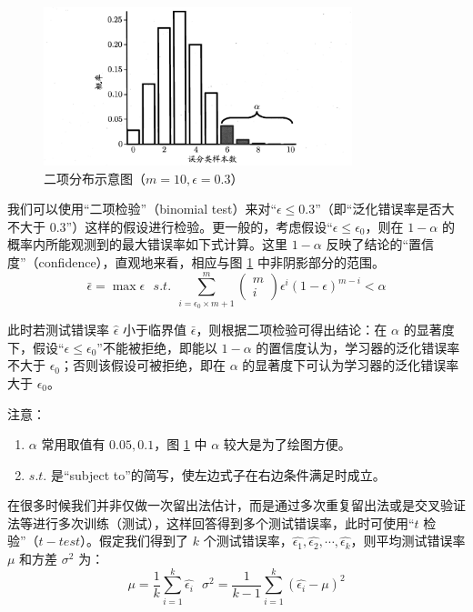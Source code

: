 \documentclass[12pt, a4paper]{article} %
\begin{document}
\begin{figure}[H]
    \centering
    \includegraphics[width=0.8\textwidth]{../img/2-7-二项分布示意图.png}
    \caption{二项分布示意图（$m = 10, \epsilon = 0.3$）}
    \label{fig:二项分布示意图}
\end{figure}

我们可以使用“二项检验”（binomial test）来对“$\epsilon \le 0.3$”（即“泛化错误率是否大不大于 $0.3$”）这样的假设进行检验。更一般的，考虑假设“$\epsilon \le \epsilon_0$，则在 $1 - \alpha$ 的概率内所能观测到的最大错误率如下式计算。这里 $1 - \alpha$ 反映了结论的“置信度”（confidence），直观地来看，相应与图 \ref{fig:二项分布示意图} 中非阴影部分的范围。
\begin{equation*}
    \bar{\epsilon} = \max \epsilon \ \ \ s.t. \ \ \sum_{i = \epsilon_0 \times m + 1}^{m} \left( {\begin{array}{*{20}{c}}
        m\\
        i
        \end{array}} \right) \epsilon^i (1 - \epsilon)^{m - i} < \alpha
\end{equation*}

此时若测试错误率 $\hat{\epsilon}$ 小于临界值 $\bar{\epsilon}$，则根据二项检验可得出结论：在 $\alpha$ 的显著度下，假设“$\epsilon \le \epsilon_0$”不能被拒绝，即能以 $1 - \alpha$ 的置信度认为，学习器的泛化错误率不大于 $\epsilon_0$；否则该假设可被拒绝，即在 $\alpha$ 的显著度下可认为学习器的泛化错误率大于 $\epsilon_0$。

注意：
\begin{enumerate}[\hspace*{2em} i.]
    \item $\alpha$ 常用取值有 $0.05, 0.1$，图 \ref{fig:二项分布示意图} 中 $\alpha$ 较大是为了绘图方便。
    \item $s.t.$ 是“subject to”的简写，使左边式子在右边条件满足时成立。
\end{enumerate}

在很多时候我们并非仅做一次留出法估计，而是通过多次重复留出法或是交叉验证法等进行多次训练（测试），这样回答得到多个测试错误率，此时可使用“$t$ 检验”（$t-test$）。假定我们得到了 $k$ 个测试错误率，$\hat{\epsilon_1}, \hat{\epsilon_2}, \cdots, \hat{\epsilon_k}$，则平均测试错误率 $\mu$ 和方差 $\sigma^2$ 为：
\begin{equation*}
    \mu = \frac{1}{k} \sum_{i = 1}^{k} \hat{\epsilon_i} \ \ \ \sigma^2 = \frac{1}{k - 1} \sum_{i = 1}^{k} (\hat{\epsilon_i} - \mu)^2
\end{equation*}
\end{document}
